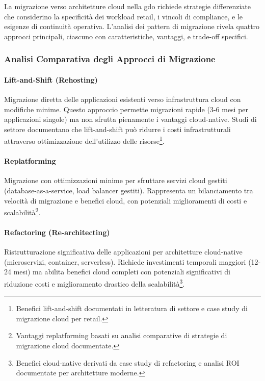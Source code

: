 La migrazione verso architetture cloud nella \gls{gdo} richiede strategie differenziate che considerino la specificità dei workload retail, i vincoli di compliance, e le esigenze di continuità operativa. L'analisi dei pattern di migrazione rivela quattro approcci principali, ciascuno con caratteristiche, vantaggi, e trade-off specifici.

\subsubsection{Analisi Comparativa degli Approcci di Migrazione}

\paragraph{Lift-and-Shift (Rehosting)}
Migrazione diretta delle applicazioni esistenti verso infrastruttura cloud con modifiche minime. Questo approccio permette migrazioni rapide (3-6 mesi per applicazioni singole) ma non sfrutta pienamente i vantaggi cloud-native. Studi di settore documentano che lift-and-shift può ridurre i costi infrastrutturali attraverso ottimizzazione dell'utilizzo delle risorse\footnote{Benefici lift-and-shift documentati in letteratura di settore e case study di migrazione cloud per retail.}.

\paragraph{Replatforming}
Migrazione con ottimizzazioni minime per sfruttare servizi cloud gestiti (database-as-a-service, load balancer gestiti). Rappresenta un bilanciamento tra velocità di migrazione e benefici cloud, con potenziali miglioramenti di costi e scalabilità\footnote{Vantaggi replatforming basati su analisi comparative di strategie di migrazione cloud documentate.}.

\paragraph{Refactoring (Re-architecting)}
Ristrutturazione significativa delle applicazioni per architetture cloud-native (microservizi, container, serverless). Richiede investimenti temporali maggiori (12-24 mesi) ma abilita benefici cloud completi con potenziali significativi di riduzione costi e miglioramento drastico della scalabilità\footnote{Benefici cloud-native derivati da case study di refactoring e analisi ROI documentate per architetture moderne.}.

